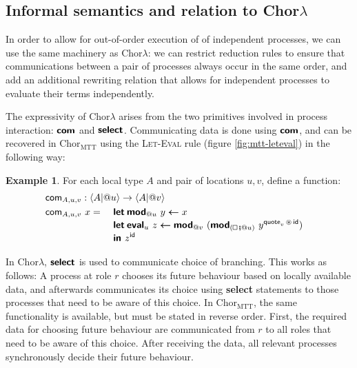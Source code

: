 \documentclass{scrartcl}
\renewcommand{\square}{\mathop{\mathchoice%
  {\tikz{\draw (0,0) rectangle (0.2cm,0.2cm);}}%
  {\tikz{\draw (0,0) rectangle (0.2cm,0.2cm);}}%
  {\tikz{\draw (0,0) rectangle (0.15cm,0.15cm);}}%
  {\tikz{\draw (0,0) rectangle (0.10cm,0.10cm);}}}}
\theoremstyle{definition}
\newtheorem{example}[definition]{Example}
\theoremstyle{plain}
\newcommand{\primitive}[1]{\textsf{\textbf{#1}}}
\newcommand{\ChorMTT}{Chor${}_{\textrm{MTT}}$}
\begin{document}

\subsection{Informal semantics and relation to
  \texorpdfstring{Chor$\lambda$}{ChorLambda}}
In order to allow for out-of-order execution of of independent processes, we
can use the same machinery as Chor$\lambda$: we can restrict reduction rules to
ensure that communications between a pair of processes always occur in the same
order, and add an additional rewriting relation that allows for independent
processes to evaluate their terms independently.

The expressivity of Chor$\lambda$ arises from the two primitives involved in
process interaction: $\primitive{com}$ and $\primitive{select}$. Communicating
data is done using $\primitive{com}$, and can be recovered in \ChorMTT{} using
the \textsc{Let-Eval} rule (figure \ref{fig:mtt-leteval}) in the following way:
\begin{example}
  For each local type $A$ and pair of locations $u,v$, define a function:
  \begin{alignat*}{3}
    & \rlap{$\textsf{com}_{A,u,v} :
        \langle A | @u \rangle \to \langle A | @v \rangle$}\\
    & \textsf{com}_{A,u,v}\ x =
      \ && \primitive{let}\:\primitive{mod}_{@u}\ y \bm{\leftarrow} x\\[-3pt]
    &   && \primitive{let}\:\primitive{eval}_u\ z \bm{\leftarrow}
             \primitive{mod}_{@v}\ (\primitive{mod}_{(\square \fatsemi @u)}
             \ y^{\textsf{quote}_v \,\circledast\, \textsf{id}})\\[-3pt]
    &   && \primitive{in } z^{\textsf{id}}
  \end{alignat*}
\end{example}
In Chor$\lambda$, $\primitive{select}$ is used to communicate choice of
branching. This works as follows: A process at role $r$ chooses its future
behaviour based on locally available data, and afterwards communicates its
choice using \primitive{select} statements to those processes that need to be
aware of this choice. In \ChorMTT{}, the same functionality is available, but
must be stated in reverse order. First, the required data for choosing future
behaviour are communicated from $r$ to all roles that need to be aware of this
choice. After receiving the data, all relevant processes synchronously decide
their future behaviour.
\end{document}
